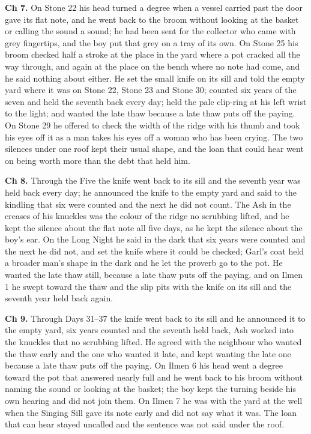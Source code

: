 \documentclass{design/chronicle}
\begin{document}
{\textbf{Ch 7.} On Stone 22 his head turned a degree when a vessel carried past the door gave its flat note, and he went back to the broom without looking at the basket or calling the sound a sound; he had been sent for the collector who came with grey fingertips, and the boy put that grey on a tray of its own. On Stone 25 his broom checked half a stroke at the place in the yard where a pot cracked all the way through, and again at the place on the bench where no note had come, and he said nothing about either. He set the small knife on its sill and told the empty yard where it was on Stone 22, Stone 23 and Stone 30; counted six years of the seven and held the seventh back every day; held the pale clip-ring at his left wrist to the light; and wanted the late thaw because a late thaw puts off the paying. On Stone 29 he offered to check the width of the ridge with his thumb and took his eyes off it as a man takes his eyes off a woman who has been crying. The two silences under one roof kept their usual shape, and the loan that could hear went on being worth more than the debt that held him.

\textbf{Ch 8.} Through the Five the knife went back to its sill and the seventh year was held back every day; he announced the knife to the empty yard and said to the kindling that six were counted and the next he did not count. The Ash in the creases of his knuckles was the colour of the ridge no scrubbing lifted, and he kept the silence about the flat note all five days, as he kept the silence about the boy’s ear. On the Long Night he said in the dark that six years were counted and the next he did not, and set the knife where it could be checked; Garl’s coat held a broader man’s shape in the dark and he let the proverb go to the pot. He wanted the late thaw still, because a late thaw puts off the paying, and on Ilmen 1 he swept toward the thaw and the slip pits with the knife on its sill and the seventh year held back again.

\textbf{Ch 9.} Through Days 31–37 the knife went back to its sill and he announced it to the empty yard, six years counted and the seventh held back, Ash worked into the knuckles that no scrubbing lifted. He agreed with the neighbour who wanted the thaw early and the one who wanted it late, and kept wanting the late one because a late thaw puts off the paying. On Ilmen 6 his head went a degree toward the pot that answered nearly full and he went back to his broom without naming the sound or looking at the basket; the boy kept the turning beside his own hearing and did not join them. On Ilmen 7 he was with the yard at the well when the Singing Sill gave its note early and did not say what it was. The loan that can hear stayed uncalled and the sentence was not said under the roof.

}
\end{document}
